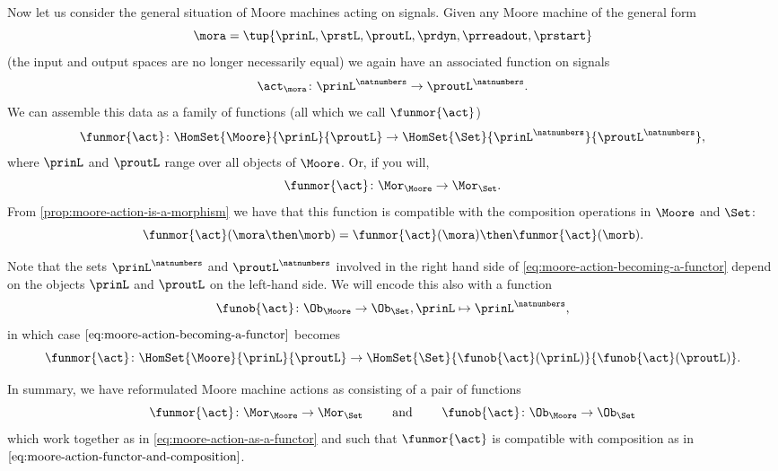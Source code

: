 Now let us consider the general situation of Moore machines acting on signals. Given any Moore machine of the general form 
$$\mora = \tup{\prinL,\prstL,\proutL,\prdyn,\prreadout,\prstart}$$ 
(the input and output spaces are no longer necessarily equal) we again have an associated function on signals
\begin{equation}
\act_{\mora} \colon {\prinL}^\natnumbers \to {\proutL}^\natnumbers.
\end{equation}
We can assemble this data as a family of functions (all which we call $\funmor{\act}$)
\begin{equation}
\label{eq:moore-action-becoming-a-functor}
\funmor{\act} \colon  \HomSet{\Moore}{\prinL}{\proutL} \to \HomSet{\Set}{\prinL^{\natnumbers}}{\proutL^{\natnumbers}},
\end{equation}
where $\prinL$ and $\proutL$ range over all objects of $\Moore$. Or, if you will, 
\begin{equation}
\funmor{\act} \colon \Mor_\Moore \to \Mor_\Set.
\end{equation}
From \cref{prop:moore-action-is-a-morphism} we have that this function is compatible with the composition operations in $\Moore$ and $\Set$: 
\begin{equation}
\label{eq:moore-action-functor-and-composition}
\funmor{\act}(\mora \then \morb) = \funmor{\act}(\mora) \then \funmor{\act}(\morb). 
\end{equation}
 

Note that the sets $\prinL^{\natnumbers}$ and $\proutL^{\natnumbers}$ involved in the right hand side of \cref{eq:moore-action-becoming-a-functor} depend on the objects $\prinL$ and $\proutL$ on the left-hand side. We will encode this also with a function 
\begin{equation}
\funob{\act} \colon \Ob_{\Moore} \to \Ob_{\Set}, \prinL \mapsto \prinL^\natnumbers,
\end{equation}
in which case $\cref{eq:moore-action-becoming-a-functor}$ becomes
\begin{equation}
\label{eq:moore-action-as-a-functor}
\funmor{\act} \colon  \HomSet{\Moore}{\prinL}{\proutL} \to \HomSet{\Set}{ \funob{\act}(\prinL)}{\funob{\act}(\proutL)}.
\end{equation}

In summary, we have reformulated Moore machine actions as consisting of a pair of functions 
\begin{equation}
\funmor{\act} \colon \Mor_\Moore \to \Mor_\Set \qquad \text{ and } \qquad \funob{\act} \colon \Ob_{\Moore} \to \Ob_{\Set}
\end{equation}
which work together as in \cref{eq:moore-action-as-a-functor} and such that $\funmor{\act}$ is compatible with composition as in $\cref{eq:moore-action-functor-and-composition}$. 

